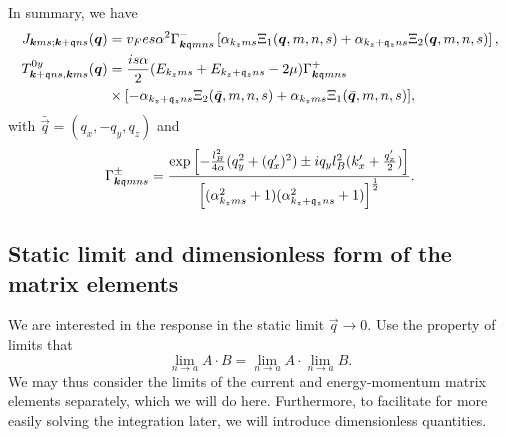 \begin{summary}
  \label{summary:tilt:matrixelements}
  In summary, we have
  \begin{align}
    \label{eq:112}
    J_{\bm{k} m s; \bm{k} + \mathfrak{q} n s} (\bm{q}) &=
                                                        v_{F} e s \alpha^2
                                                        \Gamma ^-_{\bm{k} \mathfrak{q} m n s}
                                                        \left[ \alpha_{k_z m s} \Xi_{1} (\bm{q}, m, n, s)
                                                        + \alpha_{k_z + \mathfrak{q}_z n s} \Xi _{2} (\bm{q}, m, n, s) \right],\\
    T_{\bm{k} + \mathfrak{q} n s, \bm{k} m s}^{0y} (\bm{q}) &=
                                                             \frac{is \alpha}{2}
                                                             (E_{k_z m s} + E_{k_z + \mathfrak{q}_z n  s} - 2 \mu) \Gamma ^+_{\bm{k} \mathfrak{q} m n s} \\
    \nonumber &\times [- \alpha_{k_z + \mathfrak{q}_z n s} \Xi_{2} (\bar{\bm{q}}, m, n, s) + \alpha_{k_z m s} \Xi_{1}(\bar{\bm{q}}, m, n, s)],
  \end{align}
  with \( \bar{\vec{q}} = (q_x, -q_y, q_z) \) and
  \[
    \Gamma _{\bm{k} \mathfrak{q} m n s}^{\pm} =
    \frac{
      \exp
      \left[
        - \frac{l_{B}^2}{4 \alpha } (q_{y}^2 + (q' _x)^2) \pm  i q_y l_B^2 (k' _x + \frac{q'_x}{2} )
      \right]
    }{
      \left[(\alpha_{k_z m s}^2 +1) (\alpha_{k_z + \mathfrak{q}_z ns} ^2 + 1)\right]^{\frac{1}{2}}
    }.
  \]
\end{summary}
\subsection{Static limit and dimensionless form of the matrix elements}
We are interested in the response in the static limit \( \vec{q} \to  0 \).
Use the property of limits that
\[
  \lim_{n \to a} A \cdot  B = \lim_{n \to a} A \cdot \lim_{n \to a} B.
\]
We may thus consider the limits of the current and energy-momentum matrix elements separately, which we will do here.
Furthermore, to facilitate for more easily solving the integration later, we will introduce dimensionless quantities.

